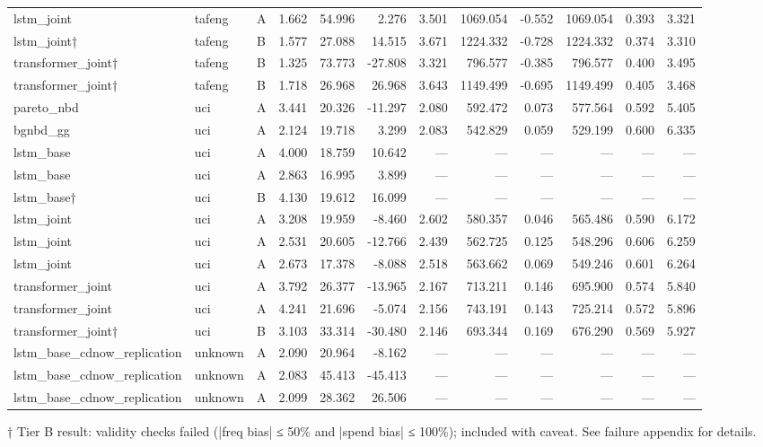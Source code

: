 \begin{table}
\begin{tabular}{lllrrrrrrrrr}
lstm_joint & tafeng & A & 1.662 & 54.996 & 2.276 & 3.501 & 1069.054 & -0.552 & 1069.054 & 0.393 & 3.321 \\
lstm_joint† & tafeng & B & 1.577 & 27.088 & 14.515 & 3.671 & 1224.332 & -0.728 & 1224.332 & 0.374 & 3.310 \\
transformer_joint† & tafeng & B & 1.325 & 73.773 & -27.808 & 3.321 & 796.577 & -0.385 & 796.577 & 0.400 & 3.495 \\
transformer_joint† & tafeng & B & 1.718 & 26.968 & 26.968 & 3.643 & 1149.499 & -0.695 & 1149.499 & 0.405 & 3.468 \\
pareto_nbd & uci & A & 3.441 & 20.326 & -11.297 & 2.080 & 592.472 & 0.073 & 577.564 & 0.592 & 5.405 \\
bgnbd_gg & uci & A & 2.124 & 19.718 & 3.299 & 2.083 & 542.829 & 0.059 & 529.199 & 0.600 & 6.335 \\
lstm_base & uci & A & 4.000 & 18.759 & 10.642 & — & — & — & — & — & — \\
lstm_base & uci & A & 2.863 & 16.995 & 3.899 & — & — & — & — & — & — \\
lstm_base† & uci & B & 4.130 & 19.612 & 16.099 & — & — & — & — & — & — \\
lstm_joint & uci & A & 3.208 & 19.959 & -8.460 & 2.602 & 580.357 & 0.046 & 565.486 & 0.590 & 6.172 \\
lstm_joint & uci & A & 2.531 & 20.605 & -12.766 & 2.439 & 562.725 & 0.125 & 548.296 & 0.606 & 6.259 \\
lstm_joint & uci & A & 2.673 & 17.378 & -8.088 & 2.518 & 563.662 & 0.069 & 549.246 & 0.601 & 6.264 \\
transformer_joint & uci & A & 3.792 & 26.377 & -13.965 & 2.167 & 713.211 & 0.146 & 695.900 & 0.574 & 5.840 \\
transformer_joint & uci & A & 4.241 & 21.696 & -5.074 & 2.156 & 743.191 & 0.143 & 725.214 & 0.572 & 5.896 \\
transformer_joint† & uci & B & 3.103 & 33.314 & -30.480 & 2.146 & 693.344 & 0.169 & 676.290 & 0.569 & 5.927 \\
lstm_base_cdnow_replication & unknown & A & 2.090 & 20.964 & -8.162 & — & — & — & — & — & — \\
lstm_base_cdnow_replication & unknown & A & 2.083 & 45.413 & -45.413 & — & — & — & — & — & — \\
lstm_base_cdnow_replication & unknown & A & 2.099 & 28.362 & 26.506 & — & — & — & — & — & — \\
\bottomrule
\end{tabular}
\end{table}
\begin{tablenotes}\small
\item[†] Tier B result: validity checks failed (|freq bias| ≤ 50\% and |spend bias| ≤ 100\%); included with caveat. See failure appendix for details.
\end{tablenotes}
